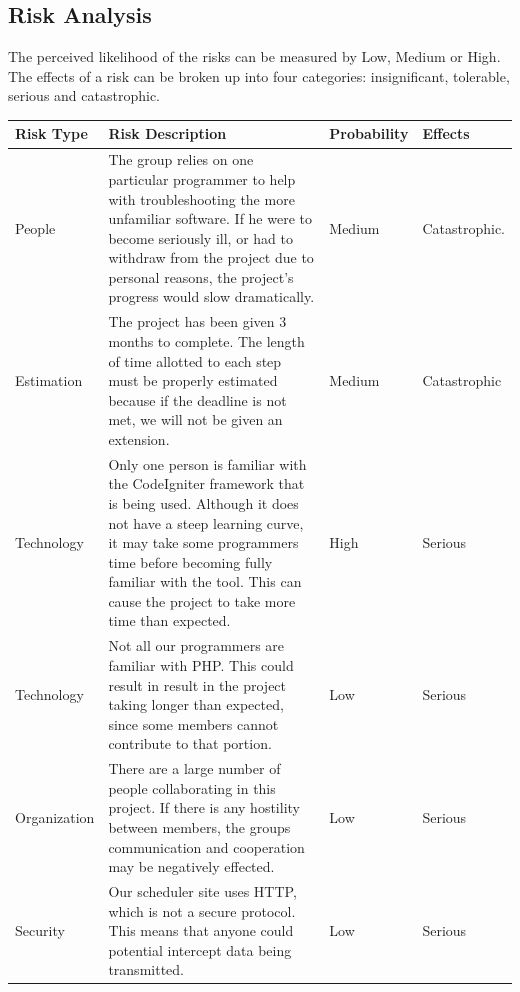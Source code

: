 \documentclass[12pt]{article}
\begin{document}
\subsection{Risk Analysis} 
The perceived likelihood of the risks can be measured by Low, Medium or High. The effects of a risk can be broken up into four categories: insignificant, tolerable, serious and catastrophic.

\begin{center}
\begin{longtable}{| p{2cm} | p{9cm} | p{2cm} | p{2cm} |}
\hline
\textbf{Risk Type}	&  \centering \textbf{Risk Description} & \textbf{Probability} & \textbf{Effects} \\ \hline \hline
People          & The group relies on one particular programmer to help with troubleshooting the more unfamiliar software. If he were to become seriously ill, or had to withdraw from the project due to personal reasons, the project's progress would slow dramatically.   & Medium & Catastrophic.    \\ \hline
Estimation  & The project has been given 3 months to complete. The length of time allotted to each step must be properly estimated because if the deadline is not met, we will not be given an extension. & Medium & Catastrophic \\ \hline

Technology		& Only one person is familiar with the CodeIgniter framework that is being used. Although it does not have a steep learning curve, it may take some programmers  time before becoming fully familiar with the tool. This can cause the project to take more time than expected. & High & Serious \\ \hline	 
Technology		& Not all our programmers are familiar with PHP. This could result in result in the project taking longer than expected, since some members cannot contribute to that portion. & Low & Serious \\ 	\hline	
Organization  & There are a large number of people collaborating in this project. If there is any hostility between members, the groups communication and cooperation may be negatively effected. & Low & Serious \\ \hline
Security		&  Our scheduler site uses HTTP, which is not a secure protocol. This means that anyone could potential intercept data being transmitted. & Low & Serious \\ \hline


\end{longtable}
\end{center}
\end{document}
